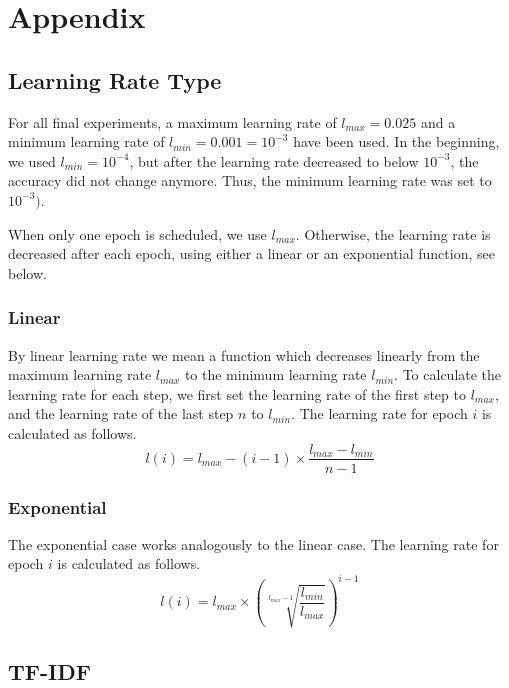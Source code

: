 \chapter{Appendix}

\section{Learning Rate Type}\label{appendix:learning-rate-type}

For all final experiments, a maximum learning rate of $l_{max}=0.025$ and a minimum learning rate of $l_{min}=0.001=10^{-3}$ have been used. In the beginning, we used $l_{min}=10^{-4}$, but after the learning rate decreased to below $10^{-3}$, the accuracy did not change anymore. Thus, the minimum learning rate was set to $10^{-3})$.

When only one epoch is scheduled, we use $l_{max}$. Otherwise, the learning rate is decreased after each epoch, using either a linear or an exponential function, see below.

\subsection{Linear}

By linear learning rate we mean a function which decreases linearly from the maximum learning rate $l_{max}$ to the minimum learning rate $l_{min}$. To calculate the learning rate for each step, we first set the learning rate of the first step to $l_{max}$, and the learning rate of the last step $n$ to $l_{min}$. The learning rate for epoch $i$ is calculated as follows.
\begin{displaymath}
l(i) = l_{max} - (i-1) \times \frac{l_{max} - l_{min}}{n-1}
\end{displaymath}

\subsection{Exponential}

The exponential case works analogously to the linear case. The learning rate for epoch $i$ is calculated as follows.
\begin{displaymath}
l(i) = l_{max} \times \left(\sqrt[l_{max}-1]{\frac{l_{min}}{l_{max}}}\right)^{i-1}
\end{displaymath}



\section{TF-IDF}\label{appendix:tf-idf}

